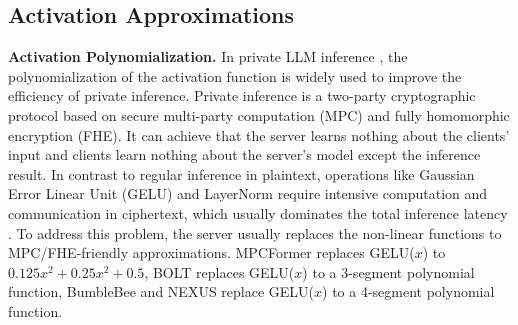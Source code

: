 \subsection{Activation Approximations}
\noindent \textbf{Activation Polynomialization.}
In private LLM inference \cite{hao2022iron, hou2023ciphergpt, pang2024bolt, lu2023bumblebee, zhang2024secure}, the polynomialization of the activation function is widely used to improve the efficiency of private inference. Private inference is a two-party cryptographic protocol based on secure multi-party computation (MPC) and fully homomorphic encryption (FHE). It can achieve that the server learns nothing about the clients' input and clients learn nothing about the server's model except the inference result. In contrast to regular inference in plaintext, operations like Gaussian Error Linear Unit (GELU) and LayerNorm require intensive computation and communication in ciphertext, which usually dominates the total inference latency \cite{wang2022characterization,li2022mpcformer,zeng2023mpcvit,rho2024encryption}. To address this problem, the server usually replaces the non-linear functions to MPC/FHE-friendly approximations. MPCFormer\cite{li2022mpcformer} replaces GELU($x$) to $0.125x^2+0.25x^2+0.5$, BOLT \cite{pang2024bolt} replaces GELU($x$) to a 3-segment polynomial function, BumbleBee\cite{lu2023bumblebee} and NEXUS \cite{zhang2024secure} replace GELU($x$) to a 4-segment polynomial function.

